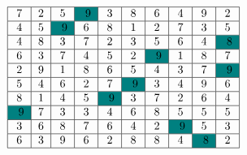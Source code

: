 \documentclass{article}
\begin{document}
\[
    \begin{tabular}{|c|c|c|c|c|c|c|c|c|c|}
        \hline
        7                  & 2 & 5                  & \cellcolor{teal} 9 & 3                  & 8                  & 6                  & 4                  & 9                  & 2                  \\
        \hline
        4                  & 5 & \cellcolor{teal} 9 & 6                  & 8                  & 1                  & 2                  & 7                  & 3                  & 5                  \\
        \hline
        4                  & 8 & 3                  & 7                  & 2                  & 3                  & 5                  & 6                  & 4                  & \cellcolor{teal} 8 \\
        \hline
        6                  & 3 & 7                  & 4                  & 5                  & 2                  & \cellcolor{teal} 9 & 1                  & 8                  & 7                  \\
        \hline
        2                  & 9 & 1                  & 8                  & 6                  & 5                  & 4                  & 3                  & 7                  & \cellcolor{teal} 9 \\
        \hline
        5                  & 4 & 6                  & 2                  & 7                  & \cellcolor{teal} 9 & 3                  & 4                  & 9                  & 6                  \\
        \hline
        8                  & 1 & 4                  & 5                  & \cellcolor{teal} 9 & 3                  & 7                  & 2                  & 6                  & 4                  \\
        \hline
        \cellcolor{teal} 9 & 7 & 3                  & 3                  & 4                  & 6                  & 8                  & 5                  & 5                  & 5                  \\
        \hline
        3                  & 6 & 8                  & 7                  & 6                  & 4                  & 2                  & \cellcolor{teal} 9 & 5                  & 3                  \\
        \hline
        6                  & 3 & 9                  & 6                  & 2                  & 8                  & 8                  & 4                  & \cellcolor{teal} 8 & 2                  \\
        \hline
    \end{tabular}
\]\\
\end{document}
